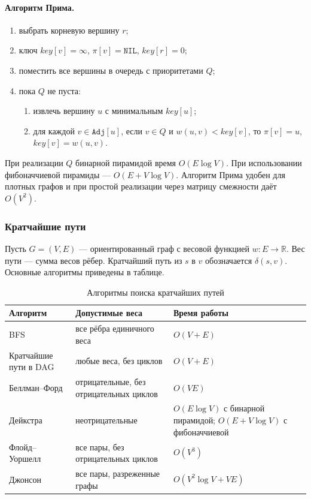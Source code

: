 \documentclass[a4paper,12pt]{article}
\begin{document}
\paragraph*{Алгоритм Прима.}
\begin{enumerate}
    \item выбрать корневую вершину \(r\);
    \item ключ \(key[v]=\infty\), \(\pi[v]=\texttt{NIL}\), \(key[r]=0\);
    \item поместить все вершины в очередь с приоритетами \(Q\);
    \item пока \(Q\) не пуста:
    \begin{enumerate}
        \item извлечь вершину \(u\) с минимальным \(key[u]\);
        \item для каждой \(v\in\texttt{Adj}[u]\), если \(v\in Q\) и \(w(u,v)<key[v]\), то \(\pi[v]=u\), \(key[v]=w(u,v)\).
    \end{enumerate}
\end{enumerate}
При реализации \(Q\) бинарной пирамидой время \(O(E\log V)\). При использовании фибоначчиевой пирамиды — \(O(E+V\log V)\). Алгоритм Прима удобен для плотных графов и при простой реализации через матрицу смежности даёт \(O(V^2)\).

\subsubsection*{Кратчайшие пути}

Пусть \(G=(V,E)\) — ориентированный граф с весовой функцией \(w:E\to\mathbb{R}\). Вес пути — сумма весов рёбер. Кратчайший путь из \(s\) в \(v\) обозначается \(\delta(s,v)\). Основные алгоритмы приведены в таблице.

\begin{table}[h]
\centering
\small
\begin{tabular}{@{}lll@{}}
\toprule
Алгоритм & Допустимые веса & Время работы \\
\midrule
BFS & все рёбра единичного веса & \(O(V+E)\) \\
Кратчайшие пути в DAG & любые веса, без циклов & \(O(V+E)\) \\
Беллман--Форд & отрицательные, без отрицательных циклов & \(O(VE)\) \\
Дейкстра & неотрицательные & \(O(E\log V)\) с бинарной пирамидой; \(O(E+V\log V)\) с фибоначчиевой \\
Флойд--Уоршелл & все пары, без отрицательных циклов & \(O(V^3)\) \\
Джонсон & все пары, разреженные графы & \(O(V^2\log V+VE)\) \\
\bottomrule
\end{tabular}
\caption{Алгоритмы поиска кратчайших путей}
\end{table}
\end{document}
